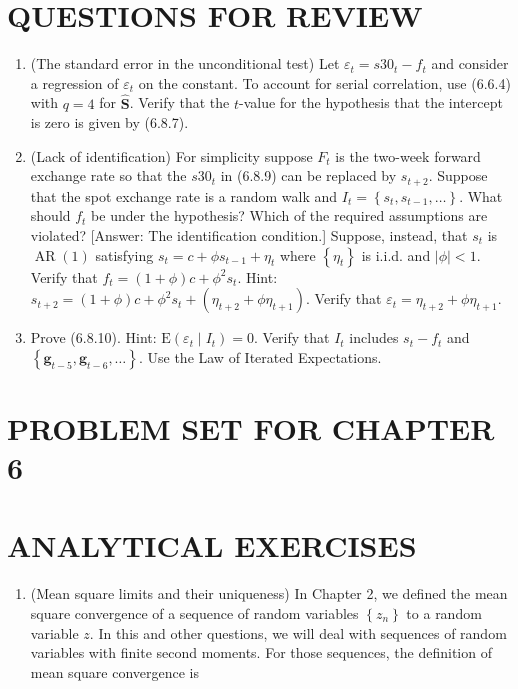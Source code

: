 \documentclass[10pt]{article}
\begin{document}
\section*{QUESTIONS FOR REVIEW}
\begin{enumerate}
  \item (The standard error in the unconditional test) Let $\varepsilon_{t}=s 30_{t}-f_{t}$ and consider a regression of $\varepsilon_{t}$ on the constant. To account for serial correlation, use (6.6.4) with $q=4$ for $\widehat{\mathbf{S}}$. Verify that the $t$-value for the hypothesis that the intercept is zero is given by (6.8.7).
  \item (Lack of identification) For simplicity suppose $F_{t}$ is the two-week forward exchange rate so that the $s 30_{t}$ in (6.8.9) can be replaced by $s_{t+2}$. Suppose that the spot exchange rate is a random walk and $I_{t}=\left\{s_{t}, s_{t-1}, \ldots\right\}$. What should $f_{t}$ be under the hypothesis? Which of the required assumptions are violated? [Answer: The identification condition.] Suppose, instead, that $s_{t}$ is $\operatorname{AR}(1)$ satisfying $s_{t}=c+\phi s_{t-1}+\eta_{t}$ where $\left\{\eta_{t}\right\}$ is i.i.d. and $|\phi|<1$. Verify that $f_{t}=(1+\phi) c+\phi^{2} s_{t}$. Hint: $s_{t+2}=(1+\phi) c+\phi^{2} s_{t}+\left(\eta_{t+2}+\phi \eta_{t+1}\right)$. Verify that $\varepsilon_{t}=\eta_{t+2}+\phi \eta_{t+1}$.
  \item Prove (6.8.10). Hint: $\mathrm{E}\left(\varepsilon_{t} \mid I_{t}\right)=0$. Verify that $I_{t}$ includes $s_{t}-f_{t}$ and $\left\{\mathbf{g}_{t-5}, \mathbf{g}_{t-6}, \ldots\right\}$. Use the Law of Iterated Expectations.
\end{enumerate}

\section*{PROBLEM SET FOR CHAPTER 6}
\section*{ANALYTICAL EXERCISES}
\begin{enumerate}
  \item (Mean square limits and their uniqueness) In Chapter 2, we defined the mean square convergence of a sequence of random variables $\left\{z_{n}\right\}$ to a random variable $z$. In this and other questions, we will deal with sequences of random variables with finite second moments. For those sequences, the definition of mean square convergence is
\end{enumerate}
\end{document}
